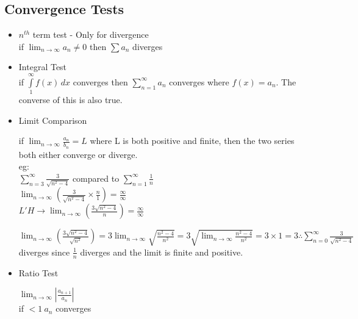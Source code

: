 \documentclass{article}
\begin{document}
  \subsection*{\color{BrickRed}Convergence Tests}
  \begin{itemize}
    \item $n^{th}$ term test - Only for divergence\\
      \subitem if \( \lim_{n\rightarrow\infty}a_n\neq0 \) then \( \sum
      a_n\) diverges\\
    \item Integral Test\\
      \subitem if \( \int\limits_{1}^{\infty} f(x) \, dx \) converges
      then \( \sum\limits_{n=1}^{\infty} a_n\) converges where \(
      f(x)=a_n\). The converse of this is also true.\\
    \item Limit Comparison\\
      \begin{multicols}{2}
      \subitem if \( \lim_{n\rightarrow\infty} \frac{a_n}{b_n} = L \)
      where L is both positive and finite, then the two series
      both either converge or diverge.\\
      \columnbreak
      \subitem eg:\\
      \( \sum\limits_{n=3}^{\infty} \frac{3}{\sqrt{n^2-4}} \)
      compared to 
      \( \sum\limits_{n=1}^{\infty}\frac{1}{n} \)\\
      \( \lim_{n\rightarrow\infty}\left( \frac{3}{\sqrt{n^2-4}}
      \times \frac{n}{1} \right)=\frac{\infty}{\infty}\)\\
      \(L'H \rightarrow \lim_{n\rightarrow\infty}\left(
      \frac{3\sqrt{n^2-4}}{n} \right)=\frac{\infty}{\infty}\)\\
    \end{multicols}
      \(\lim_{n\rightarrow\infty}\left(
      \frac{3\sqrt{n^2-4}}{\sqrt{n^2}} \right) =
      3\lim_{n\rightarrow\infty}\sqrt{\frac{n^2-4}{n^2}} =
      3\sqrt{\lim_{n\rightarrow\infty}\frac{n^2-4}{n^2}} =
      3 \times 1 = 3 \therefore \sum\limits_{n=0}^{\infty}
      \frac{3}{\sqrt{n^2-4}}\) diverges since \( \frac{1}{n} \)
      diverges and the limit is finite and positive.\\
    \item Ratio Test
      \begin{multicols}{2}
      \subitem \(\lim_{n\rightarrow\infty}\left|
      \frac{a_{n+1}}{a_n} \right|\)\\
      if \(<1 ~ a_n\) converges\\

\end{multicols}
\end{itemize}
\end{document}
